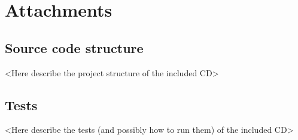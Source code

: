 \documentclass[licencjacka,en]{pracamgr}
\begin{document}
\begin{thebibliography}{99}\label{r:bibliography}













\end{thebibliography}




\chapter*{Attachments}\label{r:attachments}

\section*{Source code structure}

<Here describe the project structure of the included CD>


\section*{Tests}

<Here describe the tests (and possibly how to run them) of the included CD>
\end{document}
